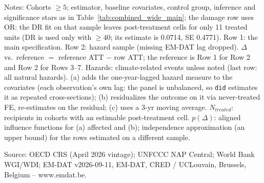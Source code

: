 \begin{table}[H]
\centering
\caption{NAP effect on log adaptation commitments with EM-DAT hazard-realization controls}
\label{tab:hazard_controls}
\par\vspace{4pt}
\begin{minipage}{\linewidth}\footnotesize
Notes: Cohorts $\geq 5$; estimator, baseline covariates, control group, inference and significance stars as in Table~\ref{tab:combined_wide_main}; the damage row uses OR: the DR fit on that sample leaves post-treatment cells for only 11 treated units (DR is used only with $\geq 40$; its estimate is 0.0714, SE 0.4771). Row 1: the main specification. Row 2: hazard sample (missing EM-DAT lag dropped). $\Delta$ vs.\ reference $=$ reference ATT $-$ row ATT; the reference is Row 1 for Row 2 and Row 2 for Rows 3--7. Hazards: climate-related events unless noted (last row: all natural hazards). (a) adds the one-year-lagged hazard measure to the covariates (each observation's own lag: the panel is unbalanced, so \texttt{did} estimates it as repeated cross-sections); (b) residualizes the outcome on it via never-treated FE, re-estimates on the residual; (c) uses a 3-yr moving average. $N_{treated}$: recipients in cohorts with an estimable post-treatment cell. $p(\Delta)$: aligned influence functions for (a) affected and (b); independence approximation (an upper bound) for the rows estimated on a different sample.\par
Source: OECD CRS (April 2026 vintage); UNFCCC NAP Central; World Bank WGI/WDI; EM-DAT v2026-09-11, EM-DAT, CRED / UCLouvain, Brussels, Belgium -- www.emdat.be.
\end{minipage}
\end{table}
